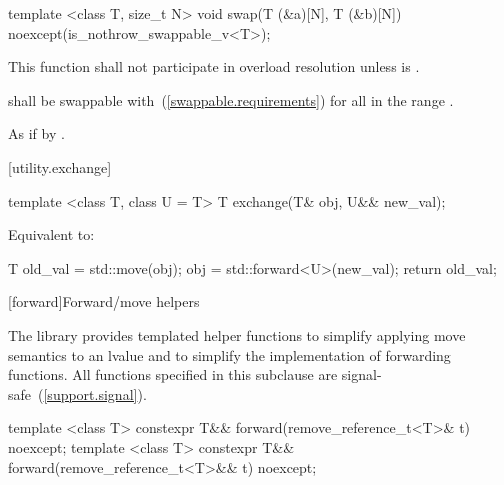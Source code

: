 %
\begin{itemdecl}
template <class T, size_t N>
  void swap(T (&a)[N], T (&b)[N]) noexcept(is_nothrow_swappable_v<T>);
\end{itemdecl}

\begin{itemdescr}
\pnum
\remarks
This function shall not participate in overload resolution
unless  is .

\pnum
\requires
{} shall be swappable with~(\ref{swappable.requirements}) 
for all  in the range .

\pnum
\effects As if by .
\end{itemdescr}

[utility.exchange]{}

%
\begin{itemdecl}
template <class T, class U = T> T exchange(T& obj, U&& new_val);
\end{itemdecl}

\begin{itemdescr}
\pnum
\effects
Equivalent to:
\begin{codeblock}
T old_val = std::move(obj);
obj = std::forward<U>(new_val);
return old_val;
\end{codeblock}
\end{itemdescr}


[forward]{Forward/move helpers}

\pnum
The library provides templated helper functions to simplify
applying move semantics to an lvalue and to simplify the implementation
of forwarding functions.
%
%
%
All functions specified in this subclause are signal-safe~(\ref{support.signal}).

%
\begin{itemdecl}
template <class T> constexpr T&& forward(remove_reference_t<T>& t) noexcept;
template <class T> constexpr T&& forward(remove_reference_t<T>&& t) noexcept;
\end{itemdecl}

